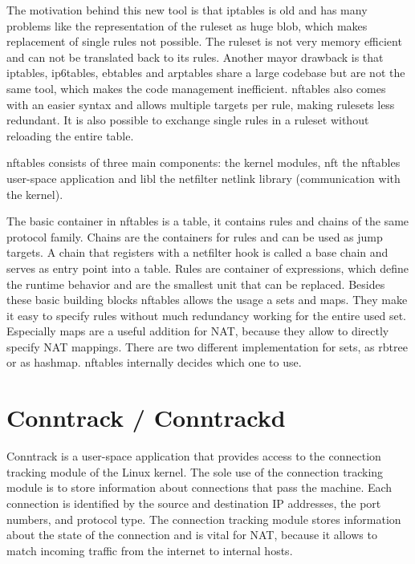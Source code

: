\documentclass{report}
\begin{document}
The motivation behind this new tool is that iptables is old and has many
problems like the representation of the ruleset as huge blob, which
makes replacement of single rules not possible. The ruleset is not very
memory efficient and can not be translated back to its rules. Another
mayor drawback is that iptables, ip6tables, ebtables and arptables share
a large codebase but are not the same tool, which makes the code
management inefficient. nftables also comes with an easier syntax and
allows multiple targets per rule, making rulesets less redundant. It is
also possible to exchange single rules in a ruleset without reloading
the entire table.

nftables consists of three main components: the kernel modules, nft the
nftables user-space application and libl the netfilter netlink library
(communication with the kernel).

The basic container in nftables is a table, it contains rules and chains
of the same protocol family. Chains are the containers for rules and can
be used as jump targets. A chain that registers with a netfilter hook is
called a base chain and serves as entry point into a table. Rules are
container of expressions, which define the runtime behavior and are the
smallest unit that can be replaced. Besides these basic building blocks
nftables allows the usage a sets and maps. They make it easy to specify
rules without much redundancy working for the entire used set.
Especially maps are a useful addition for NAT, because they allow to
directly specify NAT mappings. There are two different implementation
for sets, as rbtree or as hashmap. nftables internally decides which one
to use.

\section{Conntrack / Conntrackd}\label{conntrack-conntrackd}

Conntrack\cite{conntrack-tools} is a user-space application that provides access to the
connection tracking module\cite{conntrackSys} of the Linux kernel. The sole use of the
connection tracking module is to store information about connections
that pass the machine. Each connection is identified by the source and
destination IP addresses, the port numbers, and protocol type. The
connection tracking module stores information about the state of the
connection and is vital for NAT, because it allows to match incoming
traffic from the internet to internal hosts.
\end{document}
